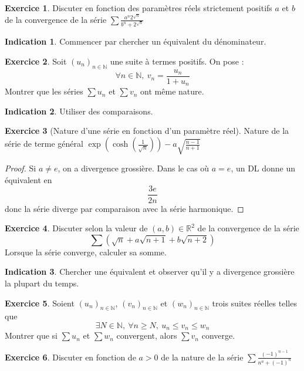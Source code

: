 \documentclass[french]{book}
\newcommand{\N}{\mathbb{N}}
\newcommand{\R}{\mathbb{R}}
\theoremstyle{definition}
\newtheorem{ex}{Exercice}[chapter]
\theoremstyle{theorem}
\newtheorem*{ind}{Indication}
\theoremstyle{remark}
\begin{document}
\begin{ex}
	Discuter en fonction des paramètres réels strictement positifs $a$ et $b$ de la convergence de la série $\displaystyle\sum\frac{a^n2^{\sqrt{n}}}{b^n+2^{\sqrt{n}}}$
\end{ex}

\begin{ind}
	Commencer par chercher un équivalent du dénominateur.
\end{ind}

\begin{ex}
	Soit $(u_n)_{n\in\N}$ une suite à termes positifs. On pose : $$\forall n\in\N,\ v_n=\frac{u_n}{1+u_n}$$ Montrer que les séries $\sum u_n$ et $\sum v_n$ ont même nature.
\end{ex}

\begin{ind}
	Utiliser des comparaisons.
\end{ind}

\begin{ex}[Nature d'une série en fonction d'un paramètre réel]
	Nature de la série de terme général $\displaystyle\exp\left(\cosh\left(\frac{1}{\sqrt{n}}\right)\right)-a\sqrt{\frac{n-1}{n+1}}$
\end{ex}
\begin{proof}
	Si $a\ne e$, on a divergence grossière. Dans le cas où $a=e$, un DL donne un équivalent en $$\frac{3e}{2n}$$ donc la série diverge par comparaison avec la série harmonique.
\end{proof}

\begin{ex}
	Discuter selon la valeur de $(a,b)\in\R^2$ de la convergence de la série $$\sum \left(\sqrt{n}+a\sqrt{n+1}+b\sqrt{n+2}\right)$$ Lorsque la série converge, calculer sa somme.
\end{ex}

\begin{ind}
	Chercher une équivalent et observer qu'il y a divergence grossière la plupart du temps.
\end{ind}

\begin{ex}
	Soient $(u_n)_{n\in\N}$, $(v_n)_{n\in\N}$ et $(w_n)_{n\in\N}$ trois suites réelles telles que $$\exists N\in\N,\ \forall n\geqslant N,\ u_n\leqslant v_n\leqslant w_n$$ Montrer que si $\displaystyle\sum u_n$ et $\displaystyle\sum w_n$ convergent, alors $\displaystyle\sum v_n$ converge.
\end{ex}

\begin{ex}
	Discuter en fonction de $a>0$ de la nature de la série $\displaystyle\sum\frac{(-1)^{n-1}}{n^a+(-1)^n}$
\end{ex}
\end{document}
